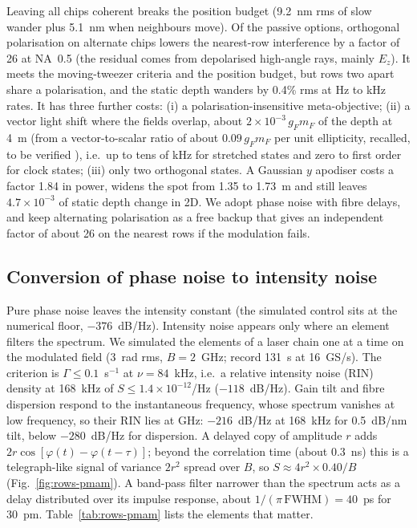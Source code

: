 Leaving all chips coherent breaks the position budget (9.2~nm rms of slow wander plus 5.1~nm when neighbours
move). Of the passive options, orthogonal polarisation on alternate chips lowers the nearest-row interference
by a factor of 26 at NA~0.5 (the residual comes from depolarised high-angle rays, mainly $E_z$). It meets the
moving-tweezer criteria and the position budget, but rows two apart share a polarisation, and the static depth
wanders by 0.4\% rms at Hz to kHz rates. It has three further costs: (i) a polarisation-insensitive
meta-objective; (ii) a vector light shift where the fields overlap, about $2\times10^{-3}\,g_Fm_F$ of the depth
at 4~\textmu m (from a vector-to-scalar ratio of about $0.09\,g_Fm_F$ per unit ellipticity, recalled, to be
verified \cite{GRIMM}), i.e.\ up to tens of kHz for stretched states and zero to first order for clock states;
(iii) only two orthogonal states. A Gaussian $y$ apodiser costs a factor 1.84 in power, widens the spot from
1.35 to 1.73~\textmu m and still leaves $4.7\times10^{-3}$ of static depth change in 2D. We adopt phase noise
with fibre delays, and keep alternating polarisation as a free backup that gives an independent factor of
about 26 on the nearest rows if the modulation fails.

\subsection{Conversion of phase noise to intensity noise}\label{sec:rows-pmam}

Pure phase noise leaves the intensity constant (the simulated control sits at the numerical floor,
$-376$~dB/Hz). Intensity noise appears only where an element filters the spectrum. We simulated the elements of
a laser chain one at a time on the modulated field (3~rad rms, $B=2$~GHz; record 131~\textmu s at 16~GS/s). The
criterion is $\Gamma\le0.1$~s$^{-1}$ at $\nu=84$~kHz, i.e.\ a relative intensity noise (RIN) density at 168~kHz
of $S\le1.4\times10^{-12}$/Hz ($-118$~dB/Hz). Gain tilt and fibre dispersion respond to the instantaneous
frequency, whose spectrum vanishes at low frequency, so their RIN lies at GHz: $-216$~dB/Hz at 168~kHz for
0.5~dB/nm tilt, below $-280$~dB/Hz for dispersion. A delayed copy of amplitude $r$ adds
$2r\cos[\varphi(t)-\varphi(t-\tau)]$; beyond the correlation time (about 0.3~ns) this is a telegraph-like
signal of variance $2r^2$ spread over $B$, so $S\approx4r^2\times0.40/B$ (Fig.~\ref{fig:rows-pmam}). A band-pass
filter narrower than the spectrum acts as a delay distributed over its impulse response, about
$1/(\pi\,\mathrm{FWHM})=40$~ps for 30~pm. Table~\ref{tab:rows-pmam} lists the elements that matter.

